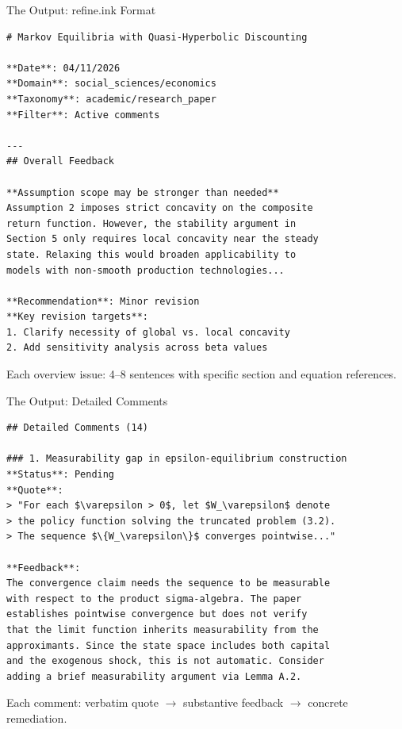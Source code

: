 \documentclass[10pt,english,aspectratio=169]{beamer}
\begin{document}
\begin{frame}[fragile]{The Output: refine.ink Format}

\begin{lstlisting}[style=markdownstyle, basicstyle=\ttfamily\scriptsize]
# Markov Equilibria with Quasi-Hyperbolic Discounting

**Date**: 04/11/2026
**Domain**: social_sciences/economics
**Taxonomy**: academic/research_paper
**Filter**: Active comments

---
## Overall Feedback

**Assumption scope may be stronger than needed**
Assumption 2 imposes strict concavity on the composite
return function. However, the stability argument in
Section 5 only requires local concavity near the steady
state. Relaxing this would broaden applicability to
models with non-smooth production technologies...

**Recommendation**: Minor revision
**Key revision targets**:
1. Clarify necessity of global vs. local concavity
2. Add sensitivity analysis across beta values
\end{lstlisting}

\vspace{0.1cm}
Each overview issue: 4--8 sentences with specific section and equation references.

\end{frame}

\begin{frame}[fragile]{The Output: Detailed Comments}

\begin{lstlisting}[style=markdownstyle, basicstyle=\ttfamily\scriptsize]
## Detailed Comments (14)

### 1. Measurability gap in epsilon-equilibrium construction
**Status**: Pending
**Quote**:
> "For each $\varepsilon > 0$, let $W_\varepsilon$ denote
> the policy function solving the truncated problem (3.2).
> The sequence $\{W_\varepsilon\}$ converges pointwise..."

**Feedback**:
The convergence claim needs the sequence to be measurable
with respect to the product sigma-algebra. The paper
establishes pointwise convergence but does not verify
that the limit function inherits measurability from the
approximants. Since the state space includes both capital
and the exogenous shock, this is not automatic. Consider
adding a brief measurability argument via Lemma A.2.
\end{lstlisting}

\vspace{0.1cm}
Each comment: verbatim quote $\to$ substantive feedback $\to$ concrete remediation.

\end{frame}
\end{document}
